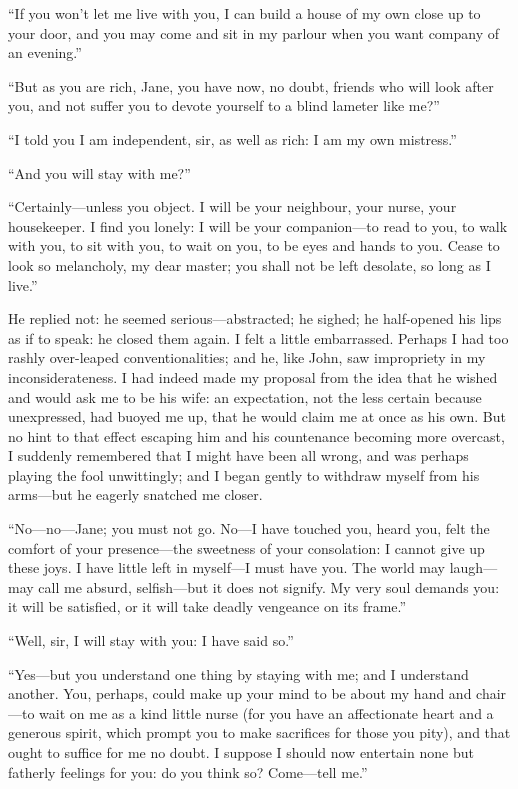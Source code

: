 \enquote{If you won't let me live with you, I can build a house of my
own close up to your door, and you may come and sit in my parlour when
you want company of an evening.}

\enquote{But as you are rich, Jane, you have now, no doubt, friends who
will look after you, and not suffer you to devote yourself to a blind
lameter like me?}

\enquote{I told you I am independent, sir, as well as rich: I am my own
mistress.}

\enquote{And you will stay with me?}

\enquote{Certainly---unless you object. I will be your neighbour, your
nurse, your housekeeper. I find you lonely: I will be your
companion---to read to you, to walk with you, to sit with you, to wait
on you, to be eyes and hands to you. Cease to look so melancholy, my
dear master; you shall not be left desolate, so long as I live.}

He replied not: he seemed serious---abstracted; he sighed; he
half-opened his lips as if to speak: he closed them again. I felt a
little embarrassed. Perhaps I had too rashly over-leaped
conventionalities; and he, like \St{} John, saw impropriety in my
inconsiderateness. I had indeed made my proposal from the idea that he
wished and would ask me to be his wife: an expectation, not the less
certain because unexpressed, had buoyed me up, that he would claim me at
once as his own. But no hint to that effect escaping him and his
countenance becoming more overcast, I suddenly remembered that I might
have been all wrong, and was perhaps playing the fool unwittingly; and I
began gently to withdraw myself from his arms---but he eagerly snatched
me closer.

\enquote{No---no---Jane; you must not go. No---I have touched you,
heard you, felt the comfort of your presence---the sweetness of your
consolation: I cannot give up these joys. I have little left in
myself---I must have you. The world may laugh---may call me absurd,
selfish---but it does not signify. My very soul demands you: it will be
satisfied, or it will take deadly vengeance on its frame.}

\enquote{Well, sir, I will stay with you: I have said so.}

\enquote{Yes---but you understand one thing by staying with me; and I
understand another. You, perhaps, could make up your mind to be about
my hand and chair---to wait on me as a kind little nurse (for you have
an affectionate heart and a generous spirit, which prompt you to make
sacrifices for those you pity), and that ought to suffice for me no
doubt. I suppose I should now entertain none but fatherly feelings for
you: do you think so? Come---tell me.}

